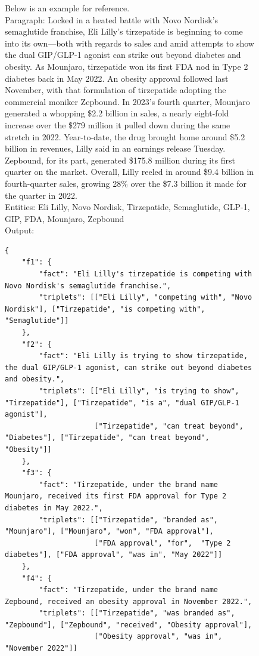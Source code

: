 \documentclass{article} %
\begin{document}
\begin{figure}[!ht]
\begin{mdframed}
Below is an example for reference. \\
Paragraph: Locked in a heated battle with Novo Nordisk’s semaglutide franchise, Eli Lilly’s tirzepatide is beginning to come into its own—both with regards to sales and amid attempts to show the dual GIP/GLP-1 agonist can strike out beyond diabetes and obesity. As Mounjaro, tirzepatide won its first FDA nod in Type 2 diabetes back in May 2022. An obesity approval followed last November, with that formulation of tirzepatide adopting the commercial moniker Zepbound. In 2023’s fourth quarter, Mounjaro generated a whopping \$2.2 billion in sales, a nearly eight-fold increase over the \$279 million it pulled down during the same stretch in 2022. Year-to-date, the drug brought home around \$5.2 billion in revenues, Lilly said in an earnings release Tuesday. Zepbound, for its part, generated \$175.8 million during its first quarter on the market. Overall, Lilly reeled in around \$9.4 billion in fourth-quarter sales, growing 28\% over the \$7.3 billion it made for the quarter in 2022.\\
Entities: Eli Lilly, Novo Nordisk, Tirzepatide, Semaglutide, GLP-1, GIP, FDA, Mounjaro, Zepbound \\
Output:\\
\begin{verbatim}
{
    "f1": {
        "fact": "Eli Lilly's tirzepatide is competing with Novo Nordisk's semaglutide franchise.",
        "triplets": [["Eli Lilly", "competing with", "Novo Nordisk"], ["Tirzepatide", "is competing with", "Semaglutide"]]
    },
    "f2": {
        "fact": "Eli Lilly is trying to show tirzepatide, the dual GIP/GLP-1 agonist, can strike out beyond diabetes and obesity.",
        "triplets": [["Eli Lilly", "is trying to show", "Tirzepatide"], ["Tirzepatide", "is a", "dual GIP/GLP-1 agonist"], 
                     ["Tirzepatide", "can treat beyond", "Diabetes"], ["Tirzepatide", "can treat beyond", "Obesity"]]
    },
    "f3": {
        "fact": "Tirzepatide, under the brand name Mounjaro, received its first FDA approval for Type 2 diabetes in May 2022.",
        "triplets": [["Tirzepatide", "branded as", "Mounjaro"], ["Mounjaro", "won", "FDA approval"], 
                     ["FDA approval", "for",  "Type 2 diabetes"], ["FDA approval", "was in", "May 2022"]]
    },
    "f4": {
        "fact": "Tirzepatide, under the brand name Zepbound, received an obesity approval in November 2022.",
        "triplets": [["Tirzepatide", "was branded as", "Zepbound"], ["Zepbound", "received", "Obesity approval"], 
                     ["Obesity approval", "was in", "November 2022"]]

\end{verbatim}
\end{mdframed}
\end{figure}
\end{document}
